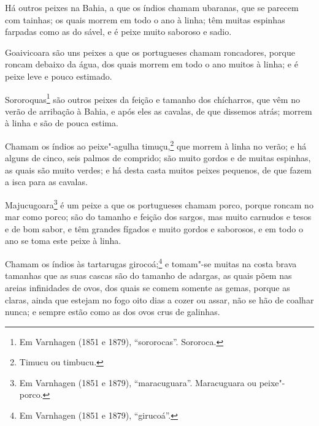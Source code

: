 \begin{linenumbers}
Há outros peixes na Bahia, a que os índios chamam ubaranas, que se parecem com tainhas; os
quais morrem em todo o ano à linha; têm muitas espinhas farpadas como as do sável, e é
peixe muito saboroso e sadio.

Goaivicoara são uns peixes a que os portugueses chamam roncadores, porque roncam debaixo
da água, dos quais morrem em todo o ano muitos à linha; e é peixe leve e pouco estimado.

Sororoquas\footnote{ Em Varnhagen (1851 e 1879), ``sororocas''. Sororoca.} são outros
peixes da feição e tamanho dos chícharros, que vêm no verão de arribação à Bahia, e após
eles as cavalas, de que dissemos atrás; morrem à linha e são de pouca estima.

Chamam os índios ao peixe"-agulha timuçu,\footnote{ Timucu ou timbucu.} que morrem à linha
no verão; e há alguns de cinco, seis palmos de comprido; são muito gordos e de muitas
espinhas, as quais são muito verdes; e há desta casta muitos peixes pequenos, de que fazem
a isca para as cavalas.

Majucugoara\footnote{ Em Varnhagen (1851 e 1879), ``maracuguara''. Maracuguara ou
peixe"-porco.} é um peixe a que os portugueses chamam porco, porque roncam no mar como
porco; são do tamanho e feição dos sargos, mas muito carnudos e tesos e de bom sabor, e
têm grandes fígados e muito gordos e saborosos, e em todo o ano se toma este peixe à
linha.

Chamam os índios às tartarugas girocoá;\footnote{ Em Varnhagen (1851 e 1879),
``girucoá''.} e tomam"-se muitas na costa brava tamanhas que as suas cascas são do tamanho
de adargas, as quais põem nas areias infinidades de ovos, dos quais se comem somente as
gemas, porque as claras, ainda que estejam no fogo oito dias a cozer ou assar, não se hão
de coalhar nunca; e sempre estão como as dos ovos crus de galinhas.


\end{linenumbers}
